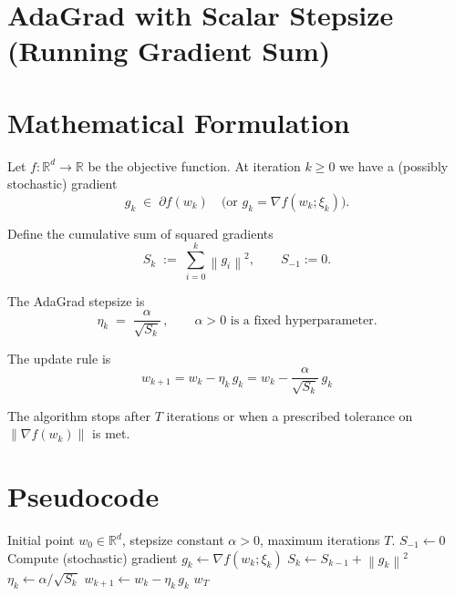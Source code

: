 \documentclass[11pt]{article}
\newcommand{\RR}{\mathbb{R}}
\newcommand{\norm}[1]{\left\|#1\right\|}
\begin{document}
\section*{AdaGrad with Scalar Stepsize (Running Gradient Sum)}

\section*{Mathematical Formulation}
Let $f:\RR^{d}\rightarrow\RR$ be the objective function.  
At iteration $k\ge 0$ we have a (possibly stochastic) gradient
\[
g_k\;\in\;\partial f(w_k)\quad\text{(or }g_k=\nabla f(w_k;\xi_k)\text{)} .
\]

Define the cumulative sum of squared gradients
\[
S_k \;:=\; \sum_{i=0}^{k} \norm{g_i}^2,\qquad S_{-1}:=0 .
\]

The AdaGrad stepsize is
\[
\eta_k \;=\; \frac{\alpha}{\sqrt{S_k}}\,,\qquad \alpha>0\text{ is a fixed hyperparameter}.
\]

The update rule is
\[
\boxed{\,w_{k+1}=w_k-\eta_k\, g_k
      = w_k-\frac{\alpha}{\sqrt{S_k}}\,g_k\, } \tag{1}
\]

The algorithm stops after $T$ iterations or when a prescribed tolerance on $\norm{\nabla f(w_k)}$ is met.

\section*{Pseudocode}
\begin{algorithm}[H]
\caption{Scalar AdaGrad}
\begin{algorithmic}[1]
\Require Initial point $w_0\in\RR^{d}$, stepsize constant $\alpha>0$, maximum iterations $T$.
\State $S_{-1}\gets 0$
    \State Compute (stochastic) gradient $g_k \gets \nabla f(w_k;\xi_k)$
    \State $S_k \gets S_{k-1}+ \norm{g_k}^2$
    \State $\eta_k \gets \alpha / \sqrt{S_k}$
    \State $w_{k+1} \gets w_k - \eta_k\, g_k$
\EndFor
\State \Return $w_T$
\end{algorithmic}
\end{algorithm}
\end{document}
